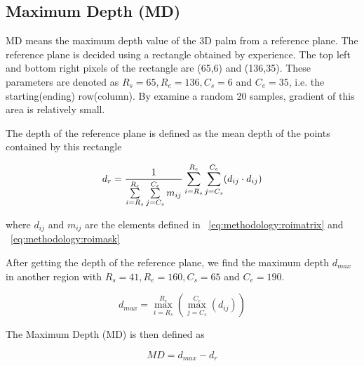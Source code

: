 \subsection{Maximum Depth (MD)}
\label{ssec:methodology:md}

MD means the maximum depth value of the 3D palm from a reference plane. The reference plane is decided using a rectangle obtained by experience. The top left and bottom right pixels of the rectangle are (65,6) and (136,35). These parameters are denoted as $R_s=65, R_e=136, C_s=6$ and $C_e=35$, i.e. the starting(ending) row(column). By examine a random 20 samples, gradient of this area is relatively small.

The depth of the reference plane is defined as the mean depth of the points contained by this rectangle

\begin{equation}
d_r = {1\over{
\sum \limits_{i=R_s}^{R_e} \sum \limits_{j=C_s}^{C_e} m_{ij}
}}
\sum \limits_{i=R_s}^{R_e} \sum \limits_{j=C_s}^{C_e} (d_{ij} \cdot d_{ij})
\end{equation}

where $d_{ij}$ and $m_{ij}$ are the elements defined in ~\ref{eq:methodology:roimatrix} and ~\ref{eq:methodology:roimask}

After getting the depth of the reference plane, we find the maximum depth $d_{max}$ in another region with $R_s=41, R_e=160, C_s=65$ and $C_e=190$.

\begin{equation}
d_{max} = \max \limits_{i=R_s}^{R_e} (\max \limits_{j=C_s}^{C_e} (d_{ij}) )
\end{equation}


The Maximum Depth (MD) is then defined as

\begin{equation}
\label{eq:methodology:md}
MD= d_{max} - d_r
\end{equation}